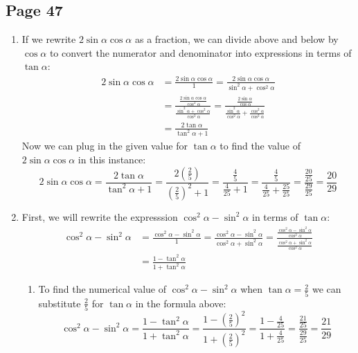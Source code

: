 \documentclass{article}
\newenvironment{solutions}[1]
{\subsection*{#1}
 \begin{enumerate}[leftmargin=1.5em]}
{\end{enumerate}}
\newcommand{\solution}{\item}
\newenvironment{subsolutions}
{\begin{enumerate}}
{\end{enumerate}}
\newcommand{\subsolution}{\item}
\begin{document}
\begin{solutions}{Page 47}
\solution %
If we rewrite $2\sin{\alpha}\cos{\alpha}$ as a fraction, we can divide above and below by $\cos{\alpha}$ to convert the numerator and denominator into expressions in terms of $\tan{\alpha}$:
\begin{align*}
2\sin{\alpha}\cos{\alpha} &= \frac{2\sin{\alpha}\cos{\alpha}}{1} = \frac{2\sin{\alpha}\cos{\alpha}}{\sin^{2}{\alpha} + \cos^{2}{\alpha}} \\
&= \frac{\frac{2\sin{\alpha}\cos{\alpha}}{\cos^{2}{\alpha}}}{\frac{\sin^{2}{\alpha} + \cos^{2}{\alpha}}{\cos^{2}{\alpha}}} = \frac{\frac{2\sin{\alpha}}{\cos{\alpha}}}{\frac{\sin^{2}{\alpha}}{\cos^{2}{\alpha}} + \frac{\cos^{2}{\alpha}}{\cos^{2}{\alpha}}} \\
&= \frac{2\tan{\alpha}}{\tan^{2}{\alpha} + 1}
\end{align*}
Now we can plug in the given value for $\tan{\alpha}$ to find the value of $2\sin{\alpha}\cos{\alpha}$ in this instance:
\begin{equation*}
2\sin{\alpha}\cos{\alpha} = \frac{2\tan{\alpha}}{\tan^{2}{\alpha} + 1} = \frac{2(\frac{2}{5})}{(\frac{2}{5})^2 + 1} = \frac{\frac{4}{5}}{\frac{4}{25} + 1} = \frac{\frac{4}{5}}{\frac{4}{25} + \frac{25}{25}} = \frac{\frac{20}{25}}{\frac{29}{25}} = \frac{20}{29}
\end{equation*}


\solution %
First, we will rewrite the expresssion $\cos^{2}{\alpha} - \sin^{2}{\alpha}$ in terms of $\tan{\alpha}$:
\begin{align*}
\cos^{2}{\alpha} - \sin^{2}{\alpha} &= \frac{\cos^{2}{\alpha} - \sin^{2}{\alpha}}{1} = \frac{\cos^{2}{\alpha} - \sin^{2}{\alpha}}{\cos^{2}{\alpha} + \sin^{2}{\alpha}} = \frac{\frac{\cos^{2}{\alpha} - \sin^{2}{\alpha}}{\cos^{2}{\alpha}}}{\frac{\cos^{2}{\alpha} + \sin^{2}{\alpha}}{\cos^{2}{\alpha}}} \\
&= \frac{1 - \tan^{2}{\alpha}}{1 + \tan^{2}{\alpha}}
\end{align*}

\begin{subsolutions}

\subsolution
To find the numerical value of $\cos^{2}{\alpha} - \sin^{2}{\alpha}$ when $\tan{\alpha} = \frac{2}{5}$ we can substitute $\frac{2}{5}$ for $\tan{\alpha}$ in the formula above:
\begin{equation*}
\cos^{2}{\alpha} - \sin^{2}{\alpha} = \frac{1 - \tan^{2}{\alpha}}{1 + \tan^{2}{\alpha}} = \frac{1 - \left(\frac{2}{5}\right)^2}{1 + \left(\frac{2}{5}\right)^2} = \frac{1 - \frac{4}{25}}{1 + \frac{4}{25}} = \frac{\frac{21}{25}}{\frac{29}{25}} = \frac{21}{29}
\end{equation*}


\end{subsolutions}
\end{solutions}
\end{document}
